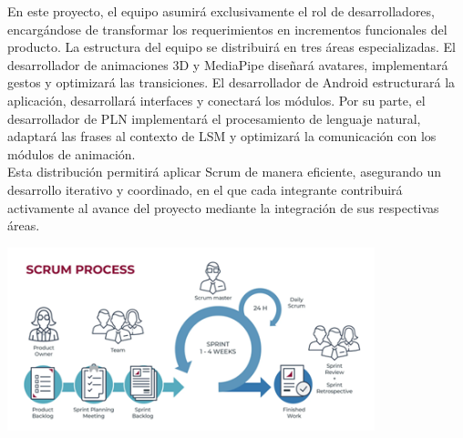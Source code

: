 En este proyecto, el equipo asumirá exclusivamente el rol de desarrolladores, encargándose de transformar los requerimientos en incrementos funcionales del producto. La estructura del equipo se distribuirá en tres áreas especializadas. El desarrollador de animaciones 3D y MediaPipe diseñará avatares, implementará gestos y optimizará las transiciones. El desarrollador de Android estructurará la aplicación, desarrollará interfaces y conectará los módulos. Por su parte, el desarrollador de PLN implementará el procesamiento de lenguaje natural, adaptará las frases al contexto de LSM y optimizará la comunicación con los módulos de animación.\\

Esta distribución permitirá aplicar Scrum de manera eficiente, asegurando un desarrollo iterativo y coordinado, en el que cada integrante contribuirá activamente al avance del proyecto mediante la integración de sus respectivas áreas.


\begin{center}
    \includegraphics[width=0.8\textwidth]{Images/metoscrum.png}
\end{center}
